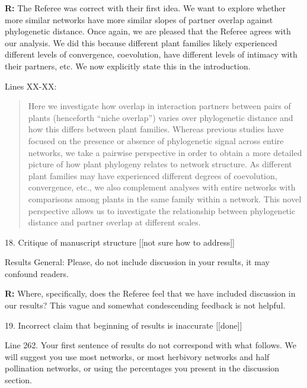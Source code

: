 \documentclass[12pt]{letter}
\newenvironment{refquote}{\bigskip \begin{it}}{\end{it}\smallskip}
\begin{document}
		\textbf{R:} The Referee was correct with their first idea. We want to explore whether more similar networks have more similar slopes of partner overlap against phylogenetic distance. Once again, we are pleased that the Referee agrees with our analysis. We did this because different plant families likely experienced different levels of convergence, coevolution, have different levels of intimacy with their partners, etc. We now explicitly state this in the introduction.


		Lines XX-XX:

		\begin{quotation}

		  Here we investigate how overlap in interaction partners between 
		  pairs of plants (henceforth ``niche overlap'') varies over 
		  phylogenetic distance and how this differs between plant families. 
		  Whereas previous 
		  studies have focused on the presence or absence of phylogenetic
		  signal across entire networks, we take a pairwise perspective in
		  order to obtain a more detailed picture of how plant phylogeny
		  relates to network structure. As different plant families may have experienced different degrees of coevolution, convergence, etc., we also complement analyses with entire networks with comparisons among plants in the same family within a network. 
		  This novel perspective allows us to investigate the relationship between phylogenetic distance and partner overlap at different scales. 

  		\end{quotation}


	18. Critique of manuscript structure [[not sure  how to address]]

		\begin{refquote}
			Results
			General: Please, do not include discussion in your results, it may confound readers.
		\end{refquote}

		\textbf{R:} Where, specifically, does the Referee feel that we have included discussion in our results? This vague and somewhat condescending feedback is not helpful.


	19. Incorrect claim that beginning of results is inaccurate [[done]]

		\begin{refquote}
			Line 262. Your first sentence of results do not correspond with what follows. We will suggest you use most networks, or most herbivory networks and half pollination networks, or using the percentages you present in the discussion section.
		\end{refquote}
\end{document}
